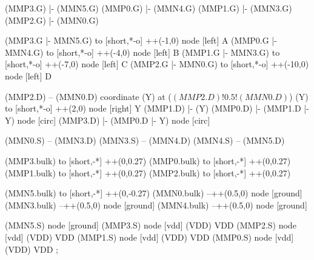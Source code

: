 \begin{circuitikz}[american]
	(MMP3.G) |- (MMN5.G)
	(MMP0.G) |- (MMN4.G)
	(MMP1.G) |- (MMN3.G)
	(MMP2.G) |- (MMN0.G)
	
	(MMP3.G |- MMN5.G) to [short,*-o] ++(-1,0) node [left] {A}
	(MMP0.G |- MMN4.G) to [short,*-o] ++(-4,0) node [left] {B}
	(MMP1.G |- MMN3.G) to [short,*-o] ++(-7,0) node [left] {C}  
	(MMP2.G |- MMN0.G) to [short,*-o] ++(-10,0) node [left] {D}
	
	(MMP2.D) -- (MMN0.D)
	coordinate (Y) at ($(MMP2.D)!0.5!(MMN0.D)$)
	(Y) to [short,*-o] ++(2,0) node [right] {Y}
	(MMP1.D) |- (Y)
	(MMP0.D) |- (MMP1.D |- Y) node [circ] {}
	(MMP3.D) |- (MMP0.D |- Y) node [circ] {}
	
	(MMN0.S) -- (MMN3.D)
	(MMN3.S) -- (MMN4.D)
	(MMN4.S) -- (MMN5.D)
	
	(MMP3.bulk) to [short,-*] ++(0,0.27)
	(MMP0.bulk) to [short,-*] ++(0,0.27)
	(MMP1.bulk) to [short,-*] ++(0,0.27)
	(MMP2.bulk) to [short,-*] ++(0,0.27)
	
	(MMN5.bulk) to [short,-*] ++(0,-0.27)
	(MMN0.bulk) --++(0.5,0) node [ground] {}
	(MMN3.bulk) --++(0.5,0) node [ground] {}
	(MMN4.bulk) --++(0.5,0) node [ground] {}


	(MMN5.S) node [ground] {}
	(MMP3.S) node [vdd] (VDD) {VDD}
	(MMP2.S) node [vdd] (VDD) {VDD}
	(MMP1.S) node [vdd] (VDD) {VDD}
	(MMP0.S) node [vdd] (VDD) {VDD}
;

\end{circuitikz}
